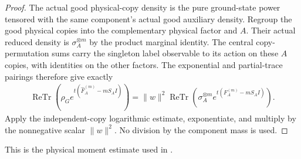 \begin{proof}
\leanok
The actual good physical-copy density is the pure ground-state power
tensored with the same component's actual good auxiliary density. Regroup
the good physical copies into the complementary physical factor and $A$.
Their actual reduced density is $\sigma_A^{\otimes m}$ by the product
marginal identity. The central copy-permutation sums carry the singleton
label observable to its action on these $A$ copies, with identities on
the other factors. The exponential and partial-trace pairings therefore
give exactly
\begin{align}
 \operatorname{ReTr}\!\left(\rho_G
 e^{t(\widehat F_A^{(m)}-mS_AI)}\right)
 =\|w\|^2\operatorname{ReTr}\!\left(
 \sigma_A^{\otimes m}e^{t(F_A^{(m)}-mS_AI)}\right).
\end{align}
Apply the independent-copy logarithmic estimate, exponentiate, and
multiply by the nonnegative scalar $\|w\|^2$. No division by the component
mass is used.
\end{proof}

This is the physical moment estimate used in
\cite[Section~7, lines~75--85, 227--238 and 556--560]{OpenAI2026AreaLaw}.
